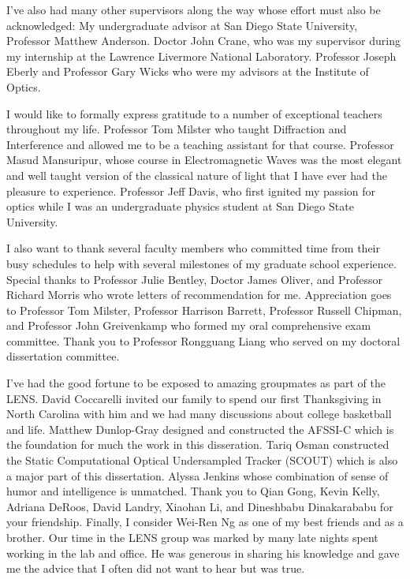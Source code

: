 I've also had many other supervisors along the way whose effort must also be acknowledged: My undergraduate advisor at San Diego State University, Professor Matthew Anderson. Doctor John Crane, who was my supervisor during my internship at the Lawrence Livermore National Laboratory. Professor Joseph Eberly and Professor Gary Wicks who were my advisors at the Institute of Optics. 

I would like to formally express gratitude to a number of exceptional teachers throughout my life. Professor Tom Milster who taught Diffraction and Interference and allowed me to be a teaching assistant for that course. Professor Masud Mansuripur, whose course in Electromagnetic Waves was the most elegant and well taught version of the classical nature of light that I have ever had the pleasure to experience. Professor Jeff Davis, who first ignited my passion for optics while I was an undergraduate physics student at San Diego State University.

I also want to thank several faculty members who committed time from their busy schedules to help with several milestones of my graduate school experience. Special thanks to Professor Julie Bentley, Doctor James Oliver, and Professor Richard Morris who wrote letters of recommendation for me. Appreciation goes to Professor Tom Milster, Professor Harrison Barrett, Professor Russell Chipman, and Professor John Greivenkamp who formed my oral comprehensive exam committee. Thank you to Professor Rongguang Liang who served on my doctoral dissertation committee.

I've had the good fortune to be exposed to amazing groupmates as part of the LENS. David Coccarelli invited our family to spend our first Thanksgiving in North Carolina with him and we had many discussions about college basketball and life. Matthew Dunlop-Gray designed and constructed the AFSSI-C which is the foundation for much the work in this disseration. Tariq Osman constructed the Static Computational Optical Undersampled Tracker (SCOUT) which is also a major part of this dissertation. Alyssa Jenkins whose combination of sense of humor and intelligence is unmatched. Thank you to Qian Gong, Kevin Kelly, Adriana DeRoos, David Landry, Xiaohan Li, and Dineshbabu Dinakarababu for your friendship. Finally, I consider Wei-Ren Ng as one of my best friends and as a brother. Our time in the LENS group was marked by many late nights spent working in the lab and office. He was generous in sharing his knowledge and gave me the advice that I often did not want to hear but was true. 

